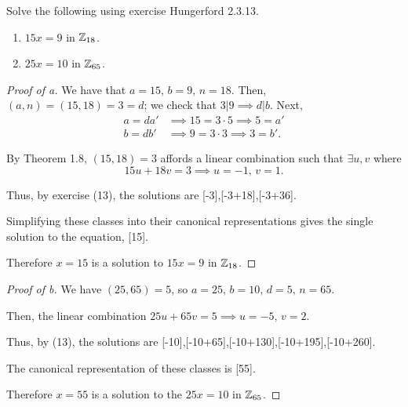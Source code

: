 \documentclass[../hw2]{subfiles}
\begin{document}
\begin{problem}[4]
Solve the following using exercise Hungerford 2.3.13.
\begin{enumerate}[label=\alph*)]
	\item $15x=9$ in  $\mathbb{Z}_{18}$.
	\item $25x=10$ in  $\mathbb{Z}_{65}$.
\end{enumerate}
\end{problem}
\begin{proof}[Proof of a]
	We have that $a=15,\, b=9,\, n=18$.
	Then, $(a,n)=(15,18)=3=d$; we check that $3|9 \implies d|b$.
	Next,
	\begin{align*}
		a=da' & \implies 15=3\cdot 5 \implies 5=a' \\
		b=db' & \implies 9=3\cdot 3 \implies 3=b'
		.\end{align*}

	By Theorem 1.8, $(15,18)=3$ affords a linear combination such that  $\exists u,v$ where \[
		15u+18v=3 \implies u=-1,\, v=1
		.\]

	Thus, by exercise (13), the solutions are [-3],[-3+18],[-3+36].

	Simplifying these classes into their canonical representations gives the single solution to the equation, [15].

	Therefore $x=15$ is a solution to  $15x=9$ in  $\mathbb{Z}_{18}$.
\end{proof}
\begin{proof}[Proof of b]
	We have $(25,65)=5$, so  $a=25,\, b=10,\, d=5,\, n=65$.

	Then, the linear combination $25u+65v=5 \implies u = -5,\,  v = 2$.

	Thus, by (13), the solutions are [-10],[-10+65],[-10+130],[-10+195],[-10+260].

	The canonical representation of these classes is [55].

	Therefore $x=55$ is a solution to the  $25x=10$ in  $\mathbb{Z}_{65}$.
\end{proof}
\end{document}
